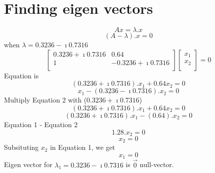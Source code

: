 \documentclass[a4paper,10pt]{article}
\begin{document}
 \section{Finding eigen vectors}
 \[ Ax = \lambda.x\]
 \[ (A-\lambda).x = 0\]
 when $\lambda = 0.3236 - \imath0.7316$
 \[
   \left[
     \begin{array}{cc}
       0.3236+\imath0.7316 & 0.64\\
       1 & -0.3236+\imath0.7316\\
     \end{array}
   \right]
   \left[
     \begin{array}{c}
       x_1\\
       x_2\\
     \end{array}
   \right] = 0
 \]
 Equation is
 \begin{equation}
   (0.3236+\imath0.7316).x_1 + 0.64x_2 = 0
 \end{equation}
  \begin{equation}
   x_1 - (0.3236-\imath0.7316).x_2 = 0
 \end{equation} 
 Multiply Equation 2 with ($0.3236+\imath0.7316$)
  \begin{equation}
   (0.3236+\imath0.7316).x_1 + 0.64x_2 = 0
 \end{equation}
  \begin{equation}
   (0.3236+\imath0.7316).x_1 - (0.64).x_2 = 0
 \end{equation}
 Equation 1 - Equation 2\\
   \[1.28.x_2 = 0\]
   \[ x_2 = 0\]
 Subsituting $x_2$ in Equation 1, we get\\
   \[ x_1 = 0 \]
 Eigen vector for $\lambda_1 = 0.3236 - \imath0.7316$ is $\overrightarrow{0}$ null-vector.\\
 
\end{document}
